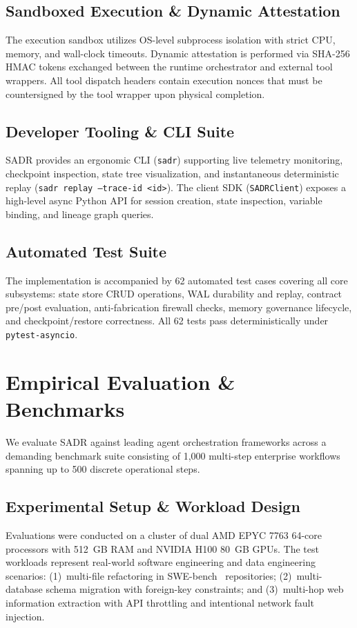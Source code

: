 \documentclass[10pt,journal,compsoc]{IEEEtran}
\begin{document}
\subsection{Sandboxed Execution \& Dynamic Attestation}
The execution sandbox utilizes OS-level subprocess isolation with strict CPU, memory, and wall-clock timeouts. Dynamic attestation is performed via SHA-256 HMAC tokens exchanged between the runtime orchestrator and external tool wrappers. All tool dispatch headers contain execution nonces that must be countersigned by the tool wrapper upon physical completion.

\subsection{Developer Tooling \& CLI Suite}
SADR provides an ergonomic CLI (\texttt{sadr}) supporting live telemetry monitoring, checkpoint inspection, state tree visualization, and instantaneous deterministic replay (\texttt{sadr replay --trace-id <id>}). The client SDK (\texttt{SADRClient}) exposes a high-level async Python API for session creation, state inspection, variable binding, and lineage graph queries.

\subsection{Automated Test Suite}
The implementation is accompanied by 62 automated test cases covering all core subsystems: state store CRUD operations, WAL durability and replay, contract pre/post evaluation, anti-fabrication firewall checks, memory governance lifecycle, and checkpoint/restore correctness. All 62 tests pass deterministically under \texttt{pytest-asyncio}.


\section{Empirical Evaluation \& Benchmarks}
We evaluate SADR against leading agent orchestration frameworks across a demanding benchmark suite consisting of 1,000 multi-step enterprise workflows spanning up to 500 discrete operational steps.

\subsection{Experimental Setup \& Workload Design}
Evaluations were conducted on a cluster of dual AMD EPYC 7763 64-core processors with 512~GB RAM and NVIDIA H100 80~GB GPUs. The test workloads represent real-world software engineering and data engineering scenarios: (1)~multi-file refactoring in SWE-bench~\cite{jimenez2024swebench} repositories; (2)~multi-database schema migration with foreign-key constraints; and (3)~multi-hop web information extraction with API throttling and intentional network fault injection.
\end{document}
